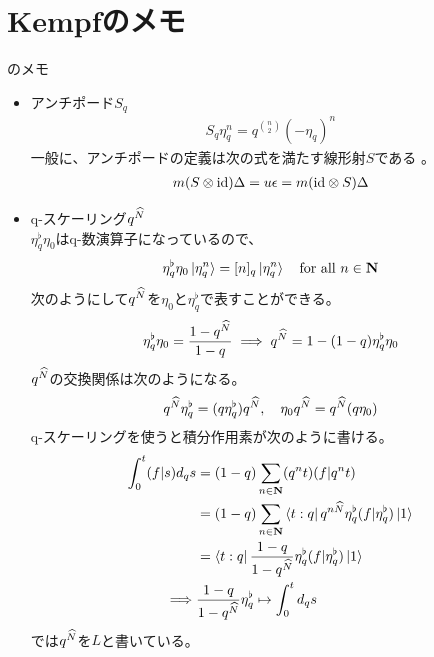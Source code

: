 {\section{Kempfのメモ}\label{s1:Kempfのメモ} %
	\cite{kempf:1994}のメモ
	\begin{itemize}\setlength{\itemsep}{-1mm} %
		\item アンチポード$S_q$
		\begin{equation*}\begin{split}
			S_q\eta_q^n = q^{\binom{n}{2}}(-\eta_q)^n
		\end{split}\end{equation*}
		一般に、アンチポードの定義は次の式を満たす線形射$S$である
		\cite{bk:jinbo.ryousigun}。
		\begin{equation*}\begin{split}
			m(S\otimes{\ensuremath{\operatorname{id}}})\Delta = u\epsilon = m({\operatorname{id}}\otimes S)\Delta
		\end{split}\end{equation*}
		\item q-スケーリング$q^{\widehat{N}}$ \\
		$\eta_q^\flat\eta_0$はq-数演算子になっているので、
		\begin{equation*}\begin{split}
			\eta_q^\flat\eta_0\mathinner{|{\eta_q^n}\rangle} = [n]_q\mathinner{|{\eta_q^n}\rangle}
			\quad\text{for all } n\in\mathbf{N}
		\end{split}\end{equation*}
		次のようにして$q^{\widehat{N}}$を$\eta_0$と$\eta_q^\flat$で表すことができる。
		\begin{equation*}\begin{split}
			\eta_q^\flat\eta_0 = \frac{1 - q^{\widehat{N}}}{1 - q}
			\implies q^{\widehat{N}} = 1 - (1 - q)\eta_q^\flat\eta_0
		\end{split}\end{equation*}
		$q^{\widehat{N}}$の交換関係は次のようになる。
		\begin{equation*}\begin{split}
			q^{\widehat{N}}\eta_q^\flat = (q\eta_q^\flat)q^{\widehat{N}},\quad
			\eta_0q^{\widehat{N}} = q^{\widehat{N}}(q\eta_0)
		\end{split}\end{equation*}
		q-スケーリングを使うと積分作用素が次のように書ける。
		\begin{equation*}\begin{split}
			\int_0^t(f|s)d_qs &= (1-q)\sum_{n\in\mathbf{N}} (q^nt)(f|q^nt) \\
			&= (1-q)\sum_{n\in\mathbf{N}}\mathinner{\langle{t:q}|}q^{n{\widehat{N}}}
				\eta_q^\flat(f|\eta_q^\flat)\mathinner{|{1}\rangle} \\
			&= \mathinner{\langle{t:q}|}\frac{1-q}{1-q^{\widehat{N}}}\eta_q^\flat(f|\eta_q^\flat)\mathinner{|{1}\rangle} \\
			\implies & \frac{1-q}{1-q^{\widehat{N}}}\eta_q^\flat\mapsto \int_0^td_qs
		\end{split}\end{equation*}
		\cite{kempf:1994}では$q^{\widehat{N}}$を$L$と書いている。
	\end{itemize} %
}

